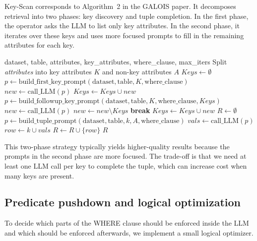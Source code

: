 \documentclass[11pt]{article}
\begin{document}
Key-Scan corresponds to Algorithm~2 in the GALOIS paper. It decomposes retrieval into
two phases: key discovery and tuple completion. In the first phase, the operator asks the
LLM to list only key attributes. In the second phase, it iterates over these keys and uses
more focused prompts to fill in the remaining attributes for each key.

\begin{algorithm}[h]
  \caption{Key-Scan}
  \label{alg:keyscan}
  \begin{algorithmic}[1]
    \Require dataset, table, attributes, key\_attributes, where\_clause, max\_iters
    \State Split \textit{attributes} into key attributes $K$ and non-key attributes $A$
    \State $Keys \gets \emptyset$
    \State $p \gets \text{build\_first\_key\_prompt}(\text{dataset}, \text{table}, K, \text{where\_clause})$
    \State $new \gets \text{call\_LLM}(p)$
    \State $Keys \gets Keys \cup new$
      \State $p \gets \text{build\_followup\_key\_prompt}(\text{dataset}, \text{table}, K, \text{where\_clause}, Keys)$
      \State $new \gets \text{call\_LLM}(p)$
      \State $new \gets new \setminus Keys$
        \State \textbf{break}
      \EndIf
      \State $Keys \gets Keys \cup new$
    \EndFor
    \State $R \gets \emptyset$
      \State $p \gets \text{build\_tuple\_prompt}(\text{dataset}, \text{table}, k, A, \text{where\_clause})$
      \State $vals \gets \text{call\_LLM}(p)$
      \State $row \gets k \cup vals$
      \State $R \gets R \cup \{row\}$
    \EndFor
    \State \Return $R$
  \end{algorithmic}
\end{algorithm}

This two-phase strategy typically yields higher-quality results because the prompts in
the second phase are more focused. The trade-off is that we need at least one LLM call
per key to complete the tuple, which can increase cost when many keys are present.

\subsection{Predicate pushdown and logical optimization}

To decide which parts of the WHERE clause should be enforced inside the LLM and
which should be enforced afterwards, we implement a small logical optimizer.
\end{document}
